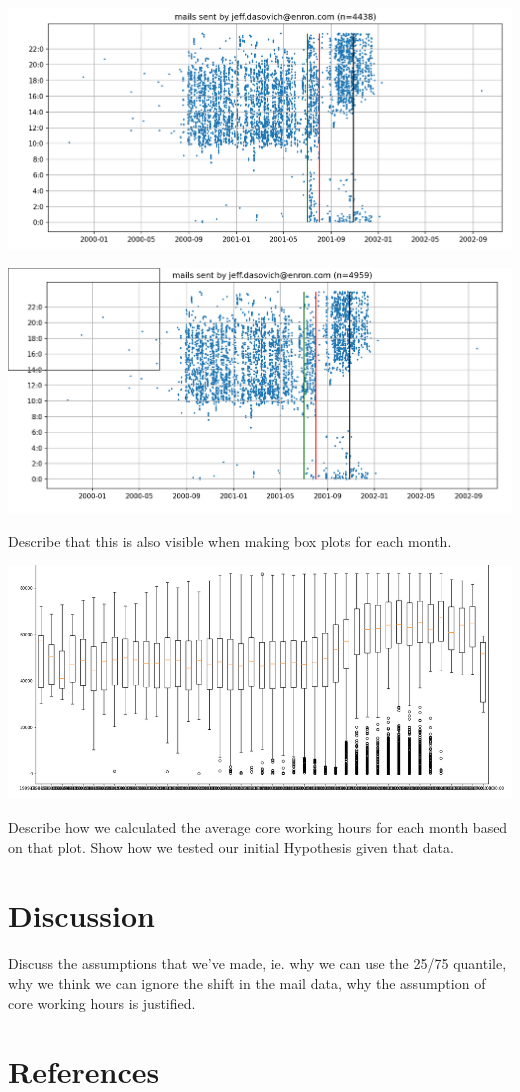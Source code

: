 \documentclass{article}
\begin{document}
\begin{center}
  \includegraphics[width=0.7\linewidth]{tmp/plot_jeff_all.png}
\end{center}
\begin{center}
  \includegraphics[width=0.7\linewidth]{tmp/plot_jeff_stripped.png}
\end{center}

Describe that this is also visible when making box plots for each month.
\begin{center}
  \includegraphics[width=0.7\linewidth]{tmp/boxplot_all.png}
\end{center}

Describe how we calculated the average core working hours for each month based
on that plot. Show how we tested our initial Hypothesis given that data.

\section{Discussion}
Discuss the assumptions that we've made, ie. why we can use the 25/75 quantile,
why we think we can ignore the shift in the mail data, why the assumption of
core working hours is justified.

\section{References}
\end{document}
